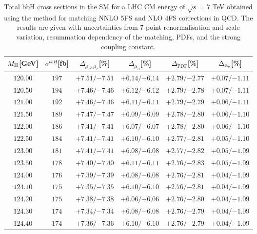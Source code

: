 \begin{table}[ht!]
\caption{Total bbH{} cross sections in the SM for a LHC CM energy of $\sqrt{s}=7$ TeV obtained using the \nlonnllpart{} method for matching NNLO 5FS and NLO 4FS corrections in QCD. The results are given with uncertainties from 7-point renormalisation and scale variation, resummation dependency of the matching, PDFs, and the strong coupling constant.}
\label{tab:bbH7}
\begin{center}%
\begin{small}%
\begin{tabular}{cccccc}%
\toprule
$M_\mathrm{H}$[GeV] & $\sigma^{bbH}$[fb] & $\Delta_{\mu_{R},\mu_{F}}$[\%] & $\Delta_{\mu_{B}}$[\%] & $\Delta_{\mathrm{PDF}}$[\%] & $\Delta_{\alpha_{\mathrm{s}}}$[\%] \\
\midrule
$120.00$ & $197$ & ${+7.51}/{-7.51}$ & ${+6.14}/{-6.14}$ & ${+2.79}/{-2.77}$ & ${+0.07}/{-1.11}$ \\
$120.50$ & $194$ & ${+7.46}/{-7.46}$ & ${+6.12}/{-6.12}$ & ${+2.79}/{-2.78}$ & ${+0.07}/{-1.11}$ \\
$121.00$ & $192$ & ${+7.46}/{-7.46}$ & ${+6.11}/{-6.11}$ & ${+2.79}/{-2.79}$ & ${+0.06}/{-1.11}$ \\
$121.50$ & $189$ & ${+7.47}/{-7.47}$ & ${+6.09}/{-6.09}$ & ${+2.78}/{-2.80}$ & ${+0.06}/{-1.10}$ \\
$122.00$ & $186$ & ${+7.41}/{-7.41}$ & ${+6.07}/{-6.07}$ & ${+2.78}/{-2.80}$ & ${+0.06}/{-1.10}$ \\
$122.50$ & $184$ & ${+7.41}/{-7.41}$ & ${+6.10}/{-6.10}$ & ${+2.77}/{-2.81}$ & ${+0.05}/{-1.10}$ \\
$123.00$ & $181$ & ${+7.41}/{-7.41}$ & ${+6.08}/{-6.08}$ & ${+2.77}/{-2.82}$ & ${+0.05}/{-1.09}$ \\
$123.50$ & $178$ & ${+7.40}/{-7.40}$ & ${+6.11}/{-6.11}$ & ${+2.76}/{-2.83}$ & ${+0.05}/{-1.09}$ \\
$124.00$ & $176$ & ${+7.39}/{-7.39}$ & ${+6.08}/{-6.08}$ & ${+2.76}/{-2.81}$ & ${+0.04}/{-1.09}$ \\
$124.10$ & $175$ & ${+7.35}/{-7.35}$ & ${+6.10}/{-6.10}$ & ${+2.76}/{-2.81}$ & ${+0.04}/{-1.09}$ \\
$124.20$ & $175$ & ${+7.38}/{-7.38}$ & ${+6.06}/{-6.06}$ & ${+2.76}/{-2.80}$ & ${+0.04}/{-1.09}$ \\
$124.30$ & $174$ & ${+7.34}/{-7.34}$ & ${+6.08}/{-6.08}$ & ${+2.76}/{-2.79}$ & ${+0.04}/{-1.09}$ \\
$124.40$ & $174$ & ${+7.36}/{-7.36}$ & ${+6.10}/{-6.10}$ & ${+2.76}/{-2.79}$ & ${+0.04}/{-1.09}$ \\

\end{tabular}
\end{small}
\end{center}
\end{table}
